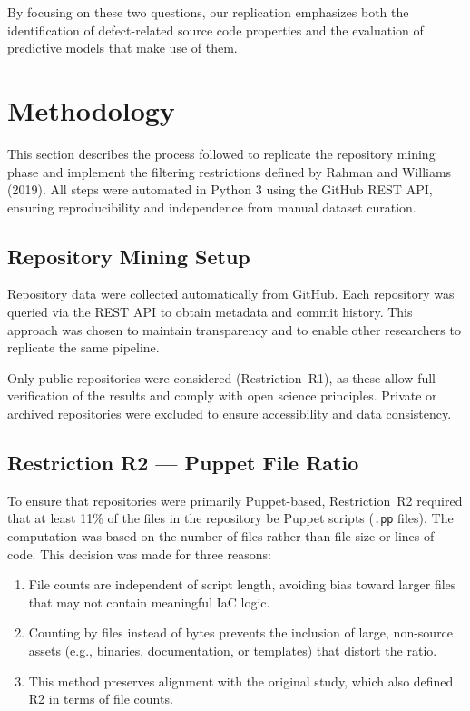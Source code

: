 \documentclass[conference]{IEEEtran}
\begin{document}
	By focusing on these two questions, our replication emphasizes both the identification of defect-related source code properties and the evaluation of predictive models that make use of them.
	
	\section{Methodology}
	This section describes the process followed to replicate the repository mining phase and implement the filtering restrictions defined by Rahman and Williams (2019). All steps were automated in Python 3 using the GitHub REST API, ensuring reproducibility and independence from manual dataset curation.
	
	\subsection{Repository Mining Setup}
	Repository data were collected automatically from GitHub. Each repository was queried via the REST API to obtain metadata and commit history. This approach was chosen to maintain transparency and to enable other researchers to replicate the same pipeline. 
	
	Only public repositories were considered (Restriction~R1), as these allow full verification of the results and comply with open science principles. Private or archived repositories were excluded to ensure accessibility and data consistency.
	
	\subsection{Restriction R2 — Puppet File Ratio}
	To ensure that repositories were primarily Puppet-based, Restriction~R2 required that at least 11\% of the files in the repository be Puppet scripts (\texttt{.pp} files). The computation was based on the number of files rather than file size or lines of code. This decision was made for three reasons:
	
	\begin{enumerate}
		\item File counts are independent of script length, avoiding bias toward larger files that may not contain meaningful IaC logic.
		\item Counting by files instead of bytes prevents the inclusion of large, non-source assets (e.g., binaries, documentation, or templates) that distort the ratio.
		\item This method preserves alignment with the original study, which also defined R2 in terms of file counts.
	\end{enumerate}
	
\end{document}

